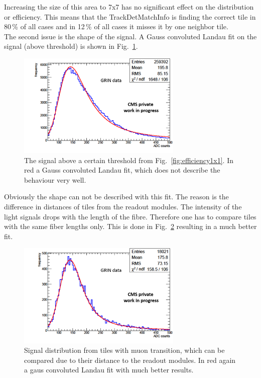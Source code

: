 			Increasing the size of this area to 7x7 has no significant effect on the distribution or efficiency.
			This means that the TrackDetMatchInfo is finding the correct tile in 80\,\% of all cases and in 12\,\% of all cases it misses it by one neighbor tile. \\
			The second issue is the shape of the signal.
			A Gauss convoluted Landau fit on the signal (above threshold) is shown in Fig.\ \ref{fig:langaus_bad}.
			\begin{figure}[htbp]
				\centering
				\includegraphics[width=0.70\textwidth]{Figures/erdogan/langaus_bad.png}
				\caption{The signal above a certain threshold from Fig.\ \ref{fig:efficiency1x1}. In red a Gauss convoluted Landau fit, which does not describe the behaviour very well.}
				\label{fig:langaus_bad}
			\end{figure}
			Obviously the shape can not be described with this fit.
			The reason is the difference in distances of tiles from the readout modules.
			The intensity of the light signals drops with the length of the fibre.
			Therefore one has to compare tiles with the same fiber lengths only.
			This is done in Fig.\ \ref{fig:langaus_good} resulting in a much better fit.
			\begin{figure}[htbp]
				\centering
				\includegraphics[width=0.70\textwidth]{Figures/erdogan/langaus_good.png}
				\caption{Signal distribution from tiles with muon transition, which can be compared due to their distance to the readout modules. In red again a gaus convoluted Landau fit with much better
				results.}
				\label{fig:langaus_good}
			\end{figure}

